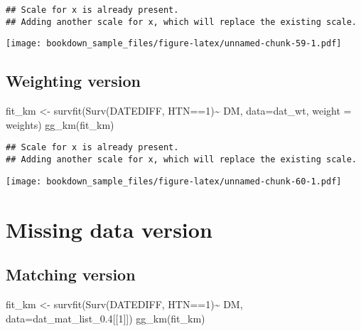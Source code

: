 \documentclass[
]{book}
\newenvironment{Shaded}{\begin{snugshade}}{\end{snugshade}}
\newcommand{\AttributeTok}[1]{\textcolor[rgb]{0.77,0.63,0.00}{#1}}
\newcommand{\DecValTok}[1]{\textcolor[rgb]{0.00,0.00,0.81}{#1}}
\newcommand{\FloatTok}[1]{\textcolor[rgb]{0.00,0.00,0.81}{#1}}
\newcommand{\FunctionTok}[1]{\textcolor[rgb]{0.00,0.00,0.00}{#1}}
\newcommand{\NormalTok}[1]{#1}
\newcommand{\OtherTok}[1]{\textcolor[rgb]{0.56,0.35,0.01}{#1}}
\newcommand{\SpecialCharTok}[1]{\textcolor[rgb]{0.00,0.00,0.00}{#1}}
\begin{document}
\begin{verbatim}
## Scale for x is already present.
## Adding another scale for x, which will replace the existing scale.
\end{verbatim}

\texttt{[image: bookdown\_sample\_files/figure-latex/unnamed-chunk-59-1.pdf]}

\hypertarget{weighting-version}{%
\subsection{Weighting version}\label{weighting-version}}

\begin{Shaded}
\begin{Highlighting}[]
\NormalTok{fit\_km }\OtherTok{\textless{}{-}} \FunctionTok{survfit}\NormalTok{(}\FunctionTok{Surv}\NormalTok{(DATEDIFF, HTN}\SpecialCharTok{==}\DecValTok{1}\NormalTok{)}\SpecialCharTok{\textasciitilde{}}\NormalTok{ DM, }\AttributeTok{data=}\NormalTok{dat\_wt, }\AttributeTok{weight =}\NormalTok{ weights)}
\FunctionTok{gg\_km}\NormalTok{(fit\_km)}
\end{Highlighting}
\end{Shaded}

\begin{verbatim}
## Scale for x is already present.
## Adding another scale for x, which will replace the existing scale.
\end{verbatim}

\texttt{[image: bookdown\_sample\_files/figure-latex/unnamed-chunk-60-1.pdf]}

\hypertarget{missing-data-version-2}{%
\section{Missing data version}\label{missing-data-version-2}}

\hypertarget{matching-version-1}{%
\subsection{Matching version}\label{matching-version-1}}

\begin{Shaded}
\begin{Highlighting}[]
\NormalTok{fit\_km }\OtherTok{\textless{}{-}} \FunctionTok{survfit}\NormalTok{(}\FunctionTok{Surv}\NormalTok{(DATEDIFF, HTN}\SpecialCharTok{==}\DecValTok{1}\NormalTok{)}\SpecialCharTok{\textasciitilde{}}\NormalTok{ DM, }\AttributeTok{data=}\NormalTok{dat\_mat\_list\_0}\FloatTok{.4}\NormalTok{[[}\DecValTok{1}\NormalTok{]])}
\FunctionTok{gg\_km}\NormalTok{(fit\_km)}
\end{Highlighting}
\end{Shaded}
\end{document}
